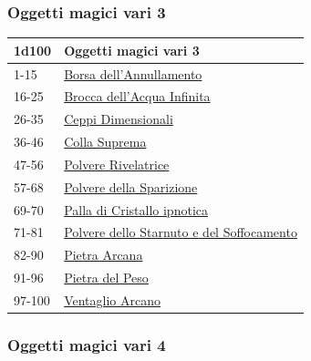 \begin{multicols}{2}
{\subsubsection{Oggetti magici vari 3}\hypertarget{Oggetti Magici Vari 3}{}

{\small\begin{tabularx}{\linewidth}{ll}
		\toprule
\rowcolor{gray!20}\textbf{1d100} & \textbf{Oggetti magici vari 3}\\
\toprule
1-15 & \hyperlink{Borsa dell'Annullamento}{Borsa dell'Annullamento}\\
\rowcolor{gray!20}16-25 & \hyperlink{Brocca dell'AcquaInfinita}{Brocca dell'Acqua Infinita}\\
26-35 & \hyperlink{Ceppi Dimensionali}{Ceppi Dimensionali}\\
\rowcolor{gray!20}36-46 & \hyperlink{Colla Suprema}{Colla Suprema}\\
47-56 & \hyperlink{Polvere Rivelatrice}{Polvere Rivelatrice}\\
\rowcolor{gray!20}57-68 & \hyperlink{Polvere della Sparizione}{Polvere della Sparizione}\\
69-70 & \hyperlink{Palla di Cristallo ipnotica}{Palla di Cristallo ipnotica}\\
\rowcolor{gray!20}71-81 & \hyperlink{Polvere delloS tarnuto e del Soffocamento}{Polvere dello Starnuto e del Soffocamento}\\
82-90 & \hyperlink{Pietra Arcana}{Pietra Arcana}\\
\rowcolor{gray!20}91-96 & \hyperlink{Pietra del Peso}{Pietra del Peso}\\
97-100 & \hyperlink{Ventaglio Arcano}{Ventaglio Arcano}
\end{tabularx}}


\subsubsection{Oggetti magici vari 4}\hypertarget{Oggetti Magici Vari 4}{}

}
\end{multicols}
